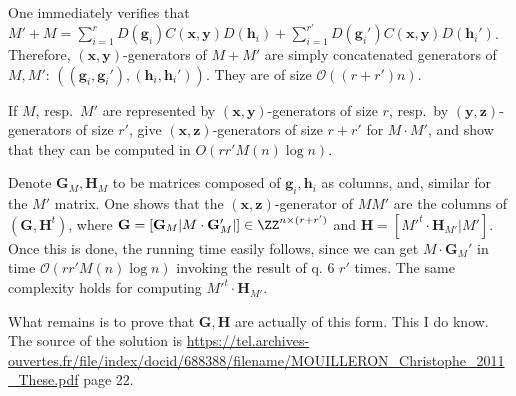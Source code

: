 \documentclass[11pt]{exam}
\theoremstyle{definition}
\newcommand{\vc}[1]{\mathbf{#1}}
\begin{document}
\begin{questions}
    \begin{solution}
		One immediately verifies that $M'+M = \sum_{i = 1}^r D(\vc g_i) C(\vc x, \vc y) D(\vc h_i) + \sum_{i = 1}^{r'} D(\vc g_i') C(\vc x, \vc y) D(\vc h_i')$. Therefore, $(\vc x, \vc y)$-generators of $M+M'$ are simply concatenated generators of $M, M'$: $((\vc g_i, \vc g_i'), (\vc h_i, \vc h_i'))$. They are of size $\mathcal{O}((r+r')n)$.
	\end{solution}
    \question If $M$, resp.~$M'$ are represented by $(\vc x, \vc y)$-generators of size $r$, resp.~by $(\vc y, \vc z)$-generators of size $r'$, give $(\vc x, \vc z)$-generators of size $r+r'$ for $M\cdot M'$, and show that they can be computed in $O(rr'M(n)\log n)$. 
    \begin{solution}
    	Denote $\mathbf{G}_M, \mathbf{H}_M$ to be matrices composed of $\vc g_i, \vc h_i$ as columns,  and, similar for the $M'$ matrix.  One shows that the $(\vc x, \vc z)$-generator of $MM'$ are the columns of $(\mathbf{G}, \mathbf{H}^t)$, where $\mathbf{G} = [\mathbf{G}_M | M \cdot \mathbf{G}_M'|] \in \ZZ^{n \times (r+r')}$ and $\mathbf{H} = [M'^t \cdot \mathbf{H}_{M'} | M']$. Once this is done, the running time easily follows, since we can get $M \cdot \mathbf{G}_M'$ in time $\mathcal{O}(rr'M(n)\log n)$ invoking the result of q. 6 $r'$ times. The same complexity holds for computing $M'^t \cdot \mathbf{H}_{M'}$.
    	
    	What remains is to prove that $\mathbf{G}, \mathbf{H}$ are actually of this form. 
    	This I do know. The source of the solution is \url{https://tel.archives-ouvertes.fr/file/index/docid/688388/filename/MOUILLERON_Christophe_2011_These.pdf} page 22.
    	
    \end{solution}

    \end{questions}
  
\end{document}
